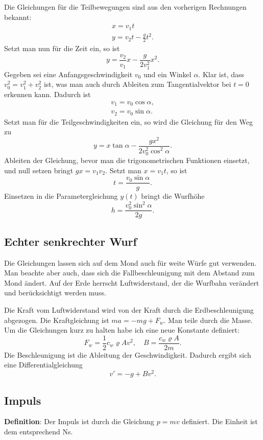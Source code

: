 \documentclass[a4paper,10pt,fleqn,twocolumn,twoside]{article}
\begin{document}
Die Gleichungen für die Teilbewegungen sind aus den vorherigen
Rechnungen bekannt:
\begin{gather*}
x = v_1t\\
y = v_2t - \frac{g}{2}t^2.
\end{gather*}
Setzt man nun für die Zeit ein, so ist
\[y = \frac{v_2}{v_1}x - \frac{g}{2v_1^2} x^2.\]
Gegeben sei eine Anfangsgeschwindigkeit \(v_0\) und ein
Winkel \(\alpha\). Klar ist, dass \(v_0^2=v_1^2+v_2^2\) ist,
was man auch durch Ableiten zum Tangentialvektor bei \(t=0\)
erkennen kann. Dadurch ist
\begin{gather*}
v_1 = v_0\cos\alpha,\\
v_2 = v_0\sin\alpha.
\end{gather*}
Setzt man für die Teilgeschwindigkeiten ein, so wird die Gleichung
für den Weg zu
\[y = x\tan\alpha - \frac{gx^2}{2v_0^2\cos^2\alpha}.\]
Ableiten der Gleichung, bevor man die trigonometrischen Funktionen
einsetzt, und null setzen bringt \(gx = v_1v_2\).
Setzt man \(x=v_1t\), so ist
\[t = \frac{v_0\sin\alpha}{g}.\]
Einsetzen in die Parametergleichung \(y(t)\) bringt die Wurfhöhe
\[h = \frac{v_0^2\sin^2\alpha}{2g}.\]

\subsection{Echter senkrechter Wurf}

Die Gleichungen lassen sich auf dem Mond auch für weite Würfe gut
verwenden. Man beachte aber auch, dass sich die Fall{}beschleunigung
mit dem Abstand zum Mond ändert. Auf der Erde herrscht Luftwiderstand,
der die Wurfbahn verändert und berücksichtigt werden muss.

Die Kraft vom Luftwiderstand wird von der Kraft durch die
Erdbeschleunigung abgezogen. Die Kraftgleichung ist \(ma = -mg + F_w\).
Man teile durch die Masse. Um die Gleichungen kurz zu halten habe
ich eine neue Konstante definiert:
\[F_w = \frac{1}{2}c_w\varrho Av^2,\quad B = \frac{c_w\varrho A}{2m}.\]
Die Beschleunigung ist die Ableitung der Geschwindigkeit.
Dadurch ergibt sich eine Differentialgleichung
\[v' = -g + Bv^2.\]

\subsection{Impuls}

\textbf{Definition}: Der Impuls ist durch die Gleichung \(p=mv\)
definiert. Die Einheit ist dem entsprechend Ns.
\end{document}
